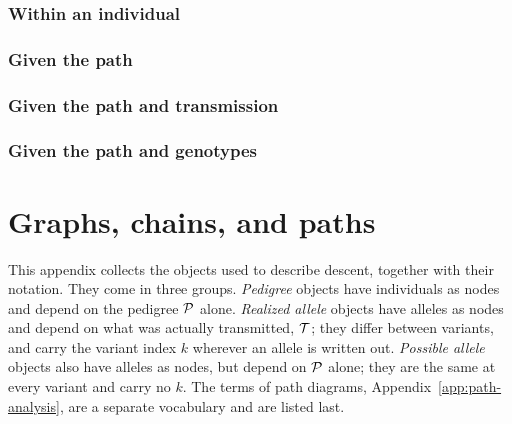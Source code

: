 \documentclass[12pt]{article}
\numberwithin{equation}{section}
\begin{document}
\subsubsection{Within an individual}\label{sec:am-geno-within}

\subsubsection{Given the path}\label{sec:am-given-path}

\subsubsection{Given the path and transmission}\label{sec:am-given-transmission}

\subsubsection{Given the path and genotypes}\label{sec:am-given-genotypes}




\clearpage
\appendixsections

\section{Graphs, chains, and paths}\label{app:vocabulary}


This appendix collects the objects used to describe descent, together with their notation.
They come in three groups.
\emph{Pedigree} objects have individuals as nodes and depend on the pedigree $\mathcal{P}$ alone.
\emph{Realized allele} objects have alleles as nodes and depend on what was actually transmitted, $\mathcal{T}$; they differ between variants, and carry the variant index $k$ wherever an allele is written out.
\emph{Possible allele} objects also have alleles as nodes, but depend on $\mathcal{P}$ alone; they are the same at every variant and carry no $k$.
The terms of path diagrams, Appendix~\ref{app:path-analysis}, are a separate vocabulary and are listed last.
\end{document}
